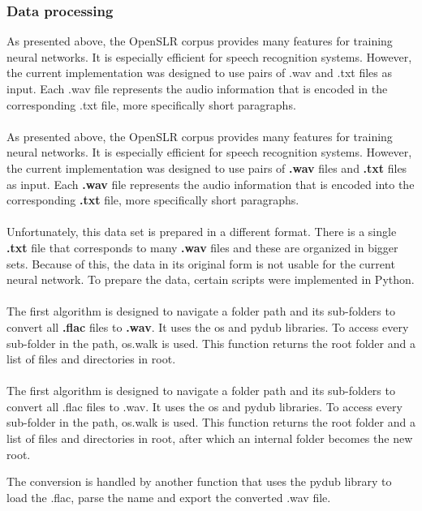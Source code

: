 \subsubsection{Data processing}
As presented above, the OpenSLR corpus provides many features for training neural networks. It is especially efficient for speech recognition systems. However, the current implementation was designed to use pairs of .wav and .txt files as input. Each .wav file represents the audio information that is encoded in the corresponding .txt file, more specifically short paragraphs.\\\\
As presented above, the OpenSLR corpus provides many features for training neural networks. It is especially efficient for speech recognition systems. However, the current implementation was designed to use pairs of \textbf{.wav} files and \textbf{.txt} files as input. Each \textbf{.wav} file represents the audio information that is encoded into the corresponding \textbf{.txt} file, more specifically short paragraphs.\\\\
Unfortunately, this data set is prepared in a different format. There is a single \textbf{.txt} file that corresponds to many \textbf{.wav} files and these are organized in bigger sets. Because of this, the data in its original form is not usable for the current neural network. To prepare the data, certain scripts were implemented in Python.\\\\
The first algorithm is designed to navigate a folder path and its sub-folders to convert all \textbf{.flac} files to \textbf{.wav}. It uses the os and pydub libraries. 
To access every sub-folder in the path, os.walk is used. This function returns the root folder and a list of files and directories in root.\\\\
The first algorithm is designed to navigate a folder path and its sub-folders to convert all .flac files to .wav. It uses the os and pydub libraries. To access every sub-folder in the path, os.walk is used. This function returns the root folder and a list of files and directories in root, after which an internal folder becomes the new root.



The conversion is handled by another function that uses the pydub library to load the .flac, parse the name and   export the converted .wav file.

